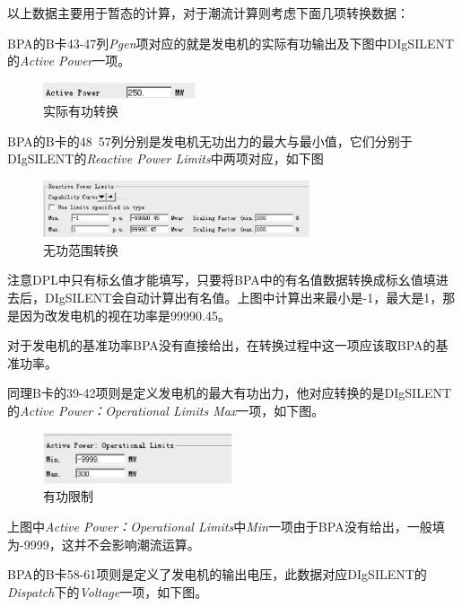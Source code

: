 以上数据主要用于暂态的计算，对于潮流计算则考虑下面几项转换数据：

BPA的B卡43-47列\emph{Pgen}项对应的就是发电机的实际有功输出及下图中DIgSILENT的\emph{Active Power}一项。

\begin{figure}[H]
\centering
\includegraphics[width=0.4\textwidth]{images/Paper_Fig_29.png}
\setcaptionwidth{\linewidth}
\caption{实际有功转换}
\end{figure}

BPA的B卡的48~57列分别是发电机无功出力的最大与最小值，它们分别于DIgSILENT的\emph{Reactive Power Limits}中两项对应，如下图

\begin{figure}[H]
\centering
\includegraphics[width=0.7\textwidth]{images/Paper_Fig_30.png}
\setcaptionwidth{\linewidth}
\caption{无功范围转换}
\end{figure}

注意DPL中只有标幺值才能填写，只要将BPA中的有名值数据转换成标幺值填进去后，DIgSILENT会自动计算出有名值。上图中计算出来最小是-1，最大是1，那是因为改发电机的视在功率是99990.45。

对于发电机的基准功率BPA没有直接给出，在转换过程中这一项应该取BPA的基准功率。

同理B卡的39-42项则是定义发电机的最大有功出力，他对应转换的是DIgSILENT的\emph{Active Power：Operational Limits Max}一项，如下图。

\begin{figure}[H]
\centering
\includegraphics[width=0.5\textwidth]{images/Paper_Fig_31.png}
\setcaptionwidth{\linewidth}
\caption{有功限制}
\end{figure}

上图中\emph{Active Power：Operational Limits}中\emph{Min}一项由于BPA没有给出，一般填为-9999，这并不会影响潮流运算。

BPA的B卡58-61项则是定义了发电机的输出电压，此数据对应DIgSILENT的\emph{Dispatch}下的\emph{Voltage}一项，如下图。

